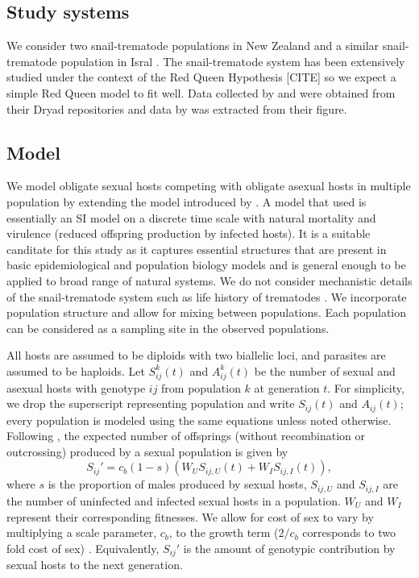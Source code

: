 \documentclass{article}\usepackage[]{graphicx}\usepackage[]{color}
\begin{document}
\subsection{Study systems}

We consider two snail-trematode populations in New Zealand \citep{vergara2014infection, mckone2016fine} and a similar snail-trematode population in Isral \citep{dagan2013clonal}. 
The snail-trematode system has been extensively studied under the context of the Red Queen Hypothesis [CITE] so we expect a simple Red Queen model to fit well.
Data collected by \cite{dagan2013clonal} and \cite{vergara2014infection} were obtained from their Dryad repositories \citep{dryad_f5t56, dryad_29nk3_2} and data by \cite{mckone2016fine} was extracted from their figure.

\subsection{Model}

We model obligate sexual hosts competing with obligate asexual hosts in multiple population by extending the model introduced by \cite{lively2010epidemiological}.
A model that \cite{lively2010epidemiological} used is essentially an SI model on a discrete time scale with natural mortality and virulence (reduced offspring production by infected hosts).
It is a suitable canditate for this study as it captures essential structures that are present in basic epidemiological and population biology models and is general enough to be applied to broad range of natural systems.
We do not consider mechanistic details of the snail-trematode system such as life history of trematodes \citep{vergara2014infection}.
We incorporate population structure and allow for mixing between populations.
Each population can be considered as a sampling site in the observed populations.

All hosts are assumed to be diploids with two biallelic loci, and parasites are assumed to be haploids.
Let $S_{ij}^k(t)$ and $A_{ij}^k(t)$ be the number of sexual and asexual hosts with genotype $ij$ from population $k$ at generation $t$. 
For simplicity, we drop the superscript representing population and write $S_{ij}(t)$ and $A_{ij}(t)$;
every population is modeled using the same equations unless noted otherwise.
Following \cite{lively2010epidemiological}, the expected number of offsprings (without recombination or outcrossing) produced by a sexual population is given by
\begin{equation}
S_{ij}' = c_b (1-s) \left(W_U S_{ij,U} (t) + W_I S_{ij,I} (t)\right),
\end{equation}
where $s$ is the proportion of males produced by sexual hosts, $S_{ij, U}$ and $S_{ij,I}$ are the number of uninfected and infected sexual hosts in a population.
$W_U$ and $W_I$ represent their corresponding fitnesses.
We allow for cost of sex to vary by multiplying a scale parameter, $c_b$, to the growth term ($2/c_b$ corresponds to two fold cost of sex) \citep{ashby2015diversity}.
Equivalently, $S_{ij}'$ is the amount of genotypic contribution by sexual hosts to the next generation.
\end{document}
